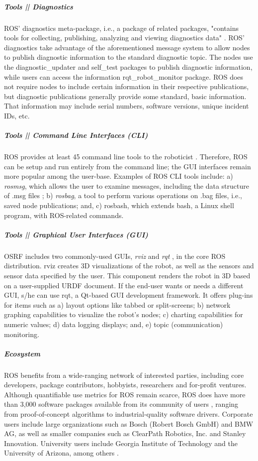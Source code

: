 \documentclass[9pt,twocolumn,twoside]{styles/osajnl}
\begin{document}
\subparagraph{Tools || Diagnostics}
ROS' diagnostics meta-package, i.e., a package of related packages,  "contains tools for collecting, publishing, analyzing and viewing diagnostics data" \cite{www-ros-diagnostics}.  ROS' diagnostics take advantage of the aforementioned message system to allow nodes to publish diagnostic information to the standard diagnostic topic.  The nodes use the diagnostic\_updater and self\_test packages to publish diagnostic information, while users can access the information rqt\_robot\_monitor package.  ROS does not require nodes to include certain information in their respective publications, but diagnostic publications generally provide some standard, basic information.  That information may include serial numbers, software versions, unique incident IDs, etc. 

\subparagraph{Tools || Command Line Interfaces (CLI)}

ROS provides at least 45 command line tools to the roboticist \cite{www-ros-cli}.  Therefore, ROS can be setup and run entirely from the command line; the GUI interfaces remain more popular among the user-base.  Examples of ROS CLI tools include: a) \textit{rosmsg}, which allows the user to examine messages, including the data structure of .msg files \cite{www-ros-messages}; b) \textit{rosbag}, a tool to perform various operations on .bag files, i.e., saved node publications; and, c) rosbash, which extends bash, a Linux shell program, with ROS-related commands. 

\subparagraph{Tools || Graphical User Interfaces (GUI)}
OSRF includes two commonly-used GUIs, \textit{rviz} and \textit{rqt} \cite{www-ros-core-components}, in the core ROS distribution.  rviz creates 3D visualizations of the robot, as well as the sensors and sensor data specified by the user.  This component renders the robot in 3D based on a user-supplied URDF document.  If the end-user wants or needs a different GUI, s/he can use rqt, a Qt-based GUI development framework.  It offers plug-ins for items such as a) layout options like tabbed or split-screens; b) network graphing capabilities to visualize the robot's nodes; c) charting capabilities for numeric values; d) data logging displays; and, e) topic (communication) monitoring.   

\subparagraph{Ecosystem}
ROS benefits from a wide-ranging network of interested parties, including core developers, package contributors, hobbyists, researchers and for-profit ventures.  Although quantifiable use metrics for ROS remain scarce, ROS does have more than 3,000 software packages available from its community of users \cite{www-ros-why}, ranging from proof-of-concept algorithms to industrial-quality software drivers.  Corporate users include large organizations such as Bosch (Robert Bosch GmbH) and BMW AG, as well as smaller companies such as ClearPath Robotics, Inc. and Stanley Innovation.  University users include Georgia Institute of Technology and the University of Arizona, among others \cite{www-ros-ecosystem}.  
\end{document}
